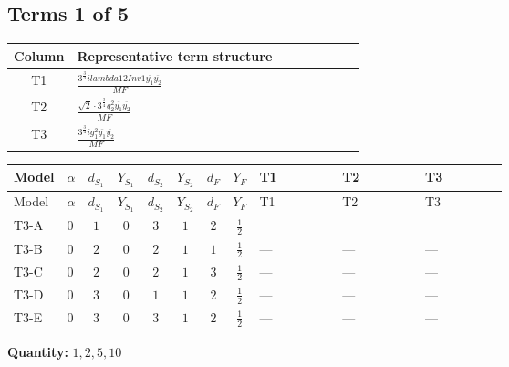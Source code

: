 \documentclass[8pt]{article}
\begin{document}
\begin{landscape}
\subsection*{Terms 1 of 5}
\begin{center}
\begin{tabular}{@{}c >{\raggedright\arraybackslash}p{0.82\linewidth}@{}}
\toprule
Column & Representative term structure \\
\midrule
T1 & \(\displaystyle \frac{3^{\frac{3}{4}} i lambda12Inv1 \overline{y_{1}} \overline{y_{2}}}{MF}\) \\
\midrule
T2 & \(\displaystyle \frac{\sqrt{2} \cdot 3^{\frac{3}{4}} g_{2}^{2} \overline{y_{1}} \overline{y_{2}}}{MF}\) \\
\midrule
T3 & \(\displaystyle \frac{3^{\frac{3}{4}} i g_{1}^{2} \overline{y_{1}} \overline{y_{2}}}{MF}\) \\
\midrule
\bottomrule
\end{tabular}
\end{center}
\smallskip
\tiny
\begin{longtable}{@{}llcccccc >{\raggedright\arraybackslash}p{0.21\linewidth} >{\raggedright\arraybackslash}p{0.21\linewidth} >{\raggedright\arraybackslash}p{0.21\linewidth}@{}}
\toprule
Model & $\alpha$ & $d_{S_1}$ & $Y_{S_1}$ & $d_{S_2}$ & $Y_{S_2}$ & $d_F$ & $Y_F$ & T1 & T2 & T3 \\
\midrule
\endfirsthead
\toprule
Model & $\alpha$ & $d_{S_1}$ & $Y_{S_1}$ & $d_{S_2}$ & $Y_{S_2}$ & $d_F$ & $Y_F$ & T1 & T2 & T3 \\
\midrule
\endhead
T3-A & $0$ & $1$ & $0$ & $3$ & $1$ & $2$ & $\frac{1}{2}$ & \scriptsize\adjustbox{max width=\linewidth}{$\begin{gathered} \frac{3^{\frac{3}{4}} i lambda12Inv1 \overline{y_{1}} \overline{y_{2}}}{6 MF}\end{gathered}$} & \scriptsize\adjustbox{max width=\linewidth}{$\begin{gathered} \frac{\sqrt{2} \cdot 3^{\frac{3}{4}} g_{2}^{2} \overline{y_{1}} \overline{y_{2}}}{6 MF}\end{gathered}$} & \scriptsize\adjustbox{max width=\linewidth}{$\begin{gathered} \frac{3^{\frac{3}{4}} i g_{1}^{2} \overline{y_{1}} \overline{y_{2}}}{8 MF}\end{gathered}$} \\
\midrule
T3-B & $0$ & $2$ & $0$ & $2$ & $1$ & $1$ & $\frac{1}{2}$ & --- & --- & --- \\
\midrule
T3-C & $0$ & $2$ & $0$ & $2$ & $1$ & $3$ & $\frac{1}{2}$ & --- & --- & --- \\
\midrule
T3-D & $0$ & $3$ & $0$ & $1$ & $1$ & $2$ & $\frac{1}{2}$ & --- & --- & --- \\
\midrule
T3-E & $0$ & $3$ & $0$ & $3$ & $1$ & $2$ & $\frac{1}{2}$ & --- & --- & --- \\
\midrule
\bottomrule
\end{longtable}
\clearpage
\noindent\textbf{Quantity: }$\mathrm{1,2,5,10}$\par\smallskip

\end{landscape}
\end{document}
